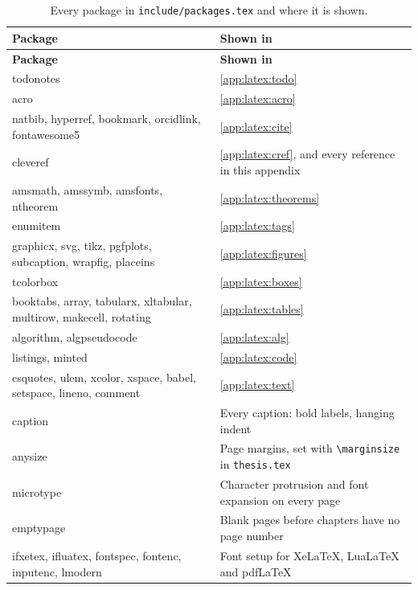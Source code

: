 \begin{xltabular}{\linewidth}{>{\ttfamily\raggedright\arraybackslash{}\hsize}X >{\raggedright\arraybackslash{}\hsize}X}
  \caption{Every package in \texttt{include/packages.tex} and where it is shown.}\label{tab:package-index}\\
  \toprule
  \normalfont\textbf{Package} & \textbf{Shown in} \\
  \midrule
  \endfirsthead
  \toprule
  \normalfont\textbf{Package} & \textbf{Shown in} \\
  \midrule
  \endhead
  todonotes & \cref{app:latex:todo} \\
  acro & \cref{app:latex:acro} \\
  natbib, hyperref, bookmark, orcidlink, fontawesome5 & \cref{app:latex:cite} \\
  cleveref & \cref{app:latex:cref}, and every reference in this appendix \\
  amsmath, amssymb, amsfonts, ntheorem & \cref{app:latex:theorems} \\
  enumitem & \cref{app:latex:tags} \\
  graphicx, svg, tikz, pgfplots, subcaption, wrapfig, placeins & \cref{app:latex:figures} \\
  tcolorbox & \cref{app:latex:boxes} \\
  booktabs, array, tabularx, xltabular, multirow, makecell, rotating & \cref{app:latex:tables} \\
  algorithm, algpseudocode & \cref{app:latex:alg} \\
  listings, minted & \cref{app:latex:code} \\
  csquotes, ulem, xcolor, xspace, babel, setspace, lineno, comment & \cref{app:latex:text} \\
  caption & Every caption: bold labels, hanging indent \\
  anysize & Page margins, set with \texttt{\textbackslash marginsize} in \texttt{thesis.tex} \\
  microtype & Character protrusion and font expansion on every page \\
  emptypage & Blank pages before chapters have no page number \\
  ifxetex, ifluatex, fontspec, fontenc, inputenc, lmodern & Font setup for XeLaTeX, LuaLaTeX and pdfLaTeX \\
  \bottomrule
\end{xltabular}

\selecthungarian
\clearpage
\clearpage
\clearpage
\clearpage
\selectthesislanguage
